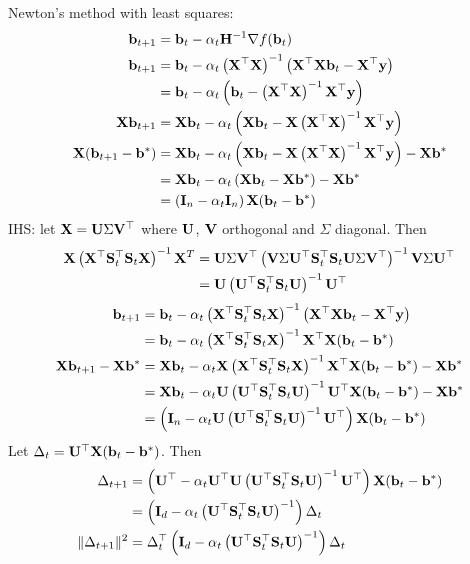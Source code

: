 \documentclass[10pt]{article}
\begin{document}
Newton's method with least squares:
\begin{align*}
\bfb_{t+1} &= \bfb_t - \alpha_t\bfH^{-1}\nabla f(\bfb_t) \\
\bfb_{t+1} &= \bfb_t - \alpha_t\left(\bfX^\T\bfX\right)^{-1}\left(\bfX^\T\bfX\bfb_t-\bfX^\T\bfy\right) \\
&= \bfb_t - \alpha_t\left(\bfb_t-\left(\bfX^\T\bfX\right)^{-1}\bfX^\T\bfy\right) \\
\bfX\bfb_{t+1} &= \bfX\bfb_t - \alpha_t\left(\bfX\bfb_t-\bfX\left(\bfX^\T\bfX\right)^{-1}\bfX^\T\bfy\right) \\
\bfX(\bfb_{t+1}-\bfb^*) &= \bfX\bfb_t - \alpha_t\left(\bfX\bfb_t-\bfX\left(\bfX^\T\bfX\right)^{-1}\bfX^\T\bfy\right) - \bfX\bfb^* \\
&= \bfX\bfb_t - \alpha_t\left(\bfX\bfb_t-\bfX\bfb^*\right) - \bfX\bfb^* \\
&= \left(\bfI_n - \alpha_t\bfI_n\right)\bfX(\bfb_t-\bfb^*)
\end{align*}
IHS: let $\bfX=\bfU\Sigma\bfV^\T$ where $\bfU$, $\bfV$ orthogonal and $\Sigma$ diagonal. Then
\begin{align*}
\bfX\left(\bfX^\T\bfS_t^\T\bfS_t\bfX\right)^{-1}\bfX^T &= \bfU\Sigma\bfV^\T\left(\bfV\Sigma\bfU^\T\bfS_t^\T\bfS_t\bfU\Sigma\bfV^\T\right)^{-1}\bfV\Sigma\bfU^\T \\
&= \bfU\left(\bfU^\T\bfS_t^\T\bfS_t\bfU\right)^{-1}\bfU^\T
\end{align*}
\begin{align*}
\bfb_{t+1} &= \bfb_t - \alpha_t\left(\bfX^\T\bfS_t^\T\bfS_t\bfX\right)^{-1}\left(\bfX^\T\bfX\bfb_t-\bfX^\T\bfy\right) \\
&= \bfb_t - \alpha_t\left(\bfX^\T\bfS_t^\T\bfS_t\bfX\right)^{-1}\bfX^\T\bfX(\bfb_t-\bfb^*) \\
\bfX\bfb_{t+1} - \bfX\bfb^* &= \bfX\bfb_t - \alpha_t\bfX\left(\bfX^\T\bfS_t^\T\bfS_t\bfX\right)^{-1}\bfX^\T\bfX(\bfb_t-\bfb^*) - \bfX\bfb^* \\
&= \bfX\bfb_t - \alpha_t\bfU\left(\bfU^\T\bfS_t^\T\bfS_t\bfU\right)^{-1}\bfU^\T\bfX(\bfb_t-\bfb^*) - \bfX\bfb^* \\
&= \left(\bfI_n - \alpha_t\bfU\left(\bfU^\T\bfS_t^\T\bfS_t\bfU\right)^{-1}\bfU^\T\right)\bfX(\bfb_t-\bfb^*)
\end{align*}
Let $\Delta_t = \bfU^\T\bfX(\bfb_t-\bfb^*)$. Then
\begin{align*}
\Delta_{t+1} &= \left(\bfU^\T - \alpha_t\bfU^\T\bfU\left(\bfU^\T\bfS_t^\T\bfS_t\bfU\right)^{-1}\bfU^\T\right)\bfX(\bfb_t-\bfb^*) \\
&= \left(\bfI_d - \alpha_t\left(\bfU^\T\bfS_t^\T\bfS_t\bfU\right)^{-1}\right)\Delta_t \\
\|\Delta_{t+1}\|^2 &= \Delta_t^\T\left(\bfI_d - \alpha_t\left(\bfU^\T\bfS_t^\T\bfS_t\bfU\right)^{-1}\right)\Delta_t
\end{align*}
\end{document}
